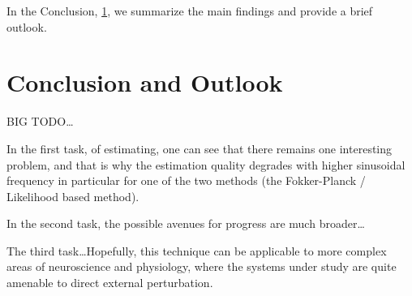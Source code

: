 \documentclass{report}
\begin{document}
In the Conclusion, \cref{ch:conclusion}, we summarize the main findings and
provide a brief outlook.

\cleardoublepage

\cleardoublepage

\cleardoublepage

\cleardoublepage

\cleardoublepage

\chapter{Conclusion and Outlook}
\label{ch:conclusion}
BIG TODO\ldots

In the first task, of estimating, one can see that there remains one interesting
problem, and that is why the estimation quality degrades with higher sinusoidal
frequency in particular for one of the two methods (the
Fokker-Planck / Likelihood based method).

In the second task, the possible avenues for progress are much broader\ldots 

The third task\ldots Hopefully, this technique can be applicable to more complex
areas of neuroscience and physiology, where the systems under study are quite amenable to direct external
perturbation.

\cleardoublepage
% 


\end{document}
